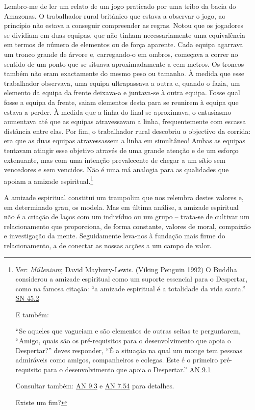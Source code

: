 Lembro-me de ler um relato de um jogo praticado por uma tribo da bacia do Amazonas. O trabalhador rural britânico que estava a observar o jogo, ao princípio não estava a conseguir compreender as regras. Notou que os jogadores se dividiam em duas equipas, que não tinham necessariamente uma equivalência em termos de número de elementos ou de força aparente. Cada equipa agarrava um tronco grande de árvore e, carregando-o em ombros, começava a correr no sentido de um ponto que se situava aproximadamente a cem metros. Os troncos também não eram exactamente do mesmo peso ou tamanho. À medida que esse trabalhador observava, uma equipa ultrapassava a outra e, quando o fazia, um elemento da equipa da frente deixava-a e juntava-se à outra equipa. Fosse qual fosse a equipa da frente, saiam elementos desta para se reunirem à equipa que estava a perder. À medida que a linha do final se aproximava, o entusiasmo aumentava até que as equipas atravessavam a linha, frequentemente com escassa distância entre elas. Por fim, o trabalhador rural descobriu o objectivo da corrida: era que as duas equipas atravessassem a linha em simultâneo! Ambas as equipas tentavam atingir esse objetivo através de uma grande atenção e de um esforço extenuante, mas com uma intenção prevalecente de chegar a um sítio sem vencedores e sem vencidos. Não é uma má analogia para as qualidades que apoiam a amizade espiritual.\footnote{Ver: \emph{Millenium}; David Maybury-Lewis. (Viking Penguin 1992) O Buddha considerou a amizade espiritual como um suporte essencial para o Despertar, como na famosa citação: ``a amizade espiritual é a totalidade da vida santa.'' \href{https://suttacentral.net/sn45.2/en/bodhi}{SN 45.2}

  E também:

  ``Se aqueles que vagueiam e são elementos de outras seitas te perguntarem, ``Amigo, quais são os pré-requisitos para o desenvolvimento que apoia o Despertar?'' deves responder, ``É a situação na qual um monge tem pessoas admiráveis como amigos, companheiros e colegas. Este é o primeiro pré-requisito para o desenvolvimento que apoia o Despertar.'' \href{https://suttacentral.net/an9.1/en/thanissaro}{AN 9.1}

  Consultar também: \href{https://suttacentral.net/an9.3/en/sujato}{AN 9.3} e \href{https://suttacentral.net/an7.54/en/thanissaro}{AN 7.54} para detalhes.

  Existe um fim?}

A amizade espiritual constitui um trampolim que nos relembra destes valores e, em determinado grau, os modela. Mas em última análise, a amizade espiritual não é a criação de laços com um indivíduo ou um grupo -- trata-se de cultivar um relacionamento que proporciona, de forma constante, valores de moral, compaixão e investigação da mente. Seguidamente leva-nos à fundação mais firme do relacionamento, a de conectar as nossas acções a um campo de valor.

